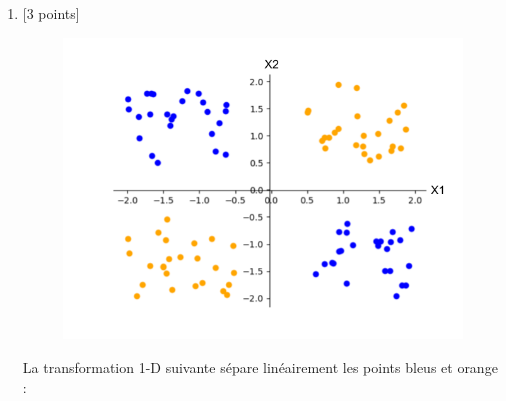 {\begin{enumerate}
	                  \begin{reponse}

		                  La transformation 1-D suivante sépare linéairement les points étiquetés par X et O :
		                  \begin{equation*}
			                  \phi(x) = \sin\left(\pi x\right)
		                  \end{equation*}
		                  $\phi(x) \geq 0$ lorsque $x \in$X et $\phi(x) < 0$ si $x \in$O
	                  \end{reponse}

	            \item { [3 points]
	                  \begin{figure}[h]
		                  \centerline{\includegraphics[scale=0.4]{img/Q2-b.png}}
		                  \caption{}
		                  \label{b}
	                  \end{figure}}

	                  \begin{reponse}

		                  La transformation 1-D suivante sépare linéairement les points bleus et orange :


\end{reponse}
\end{enumerate}}
